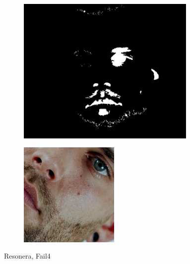 \begin{figure}[H]
\begin{subfigure}{.25\textwidth}
  \includegraphics[width=0.95\textwidth]{img/fd3/fail4_eyeCandidates.png}
  \caption{}
\end{subfigure}%
\begin{subfigure}{.25\textwidth}
  \centering
  \includegraphics[width=0.53\textwidth]{img/fd3/fail4_output.png}
  \caption{}
\end{subfigure}%

\caption{Resonera, Fail4}
\label{fig:fail4}
\end{figure}






